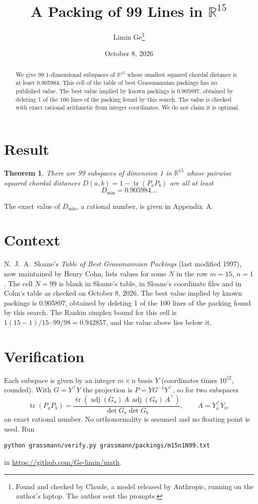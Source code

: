 \documentclass[11pt,a4paper]{article}
\title{A Packing of 99 Lines in $\mathbb{R}^{15}$}
\author{Limin Ge\thanks{Found and checked by Claude, a model released by Anthropic, running on the author's laptop. The author sent the prompts.}}
\date{October 8, 2026}
\newtheorem*{theorem}{Theorem}
\begin{document}
\maketitle
\begin{abstract}
We give 99 1-dimensional subspaces of $\mathbb{R}^{15}$ whose smallest squared chordal distance is at least 0.905984. This cell of the table of best Grassmannian packings has no published value. The best value implied by known packings is 0.905897, obtained by deleting 1 of the 100 lines of the packing found by this search. The value is checked with exact rational arithmetic from integer coordinates. We do not claim it is optimal.
\end{abstract}

\section{Result}
\begin{theorem}
There are 99 subspaces of dimension 1 in $\mathbb{R}^{15}$ whose pairwise squared chordal distances $D(a,b) = 1 - \operatorname{tr}(P_aP_b)$ are all at least
\[ D_{\min} = 0.905984\ldots \]
\end{theorem}
The exact value of $D_{\min}$, a rational number, is given in Appendix~A.


\section{Context}
N.~J.~A.~Sloane's \emph{Table of Best Grassmannian Packings} (last modified 1997), now maintained by Henry Cohn, lists values for some $N$ in the row $m=15$, $n=1$. The cell $N=99$ is blank in Sloane's table, in Sloane's coordinate files and in Cohn's table as checked on October 8, 2026. The best value implied by known packings is 0.905897, obtained by deleting 1 of the 100 lines of the packing found by this search. The Rankin simplex bound for this cell is $1(15-1)/15\cdot 99/98 = 0.942857$, and the value above lies below it.


\section{Verification}
Each subspace is given by an integer $m\times n$ basis $Y$ (coordinates times $10^{12}$, rounded). With $G=Y^\top Y$ the projection is $P=YG^{-1}Y^\top$, so for two subspaces
\[ \operatorname{tr}(P_aP_b)=\frac{\operatorname{tr}(\operatorname{adj}(G_a)\,A\,\operatorname{adj}(G_b)\,A^\top)}{\det G_a\det G_b},\qquad A=Y_a^\top Y_b, \]
an exact rational number. No orthonormality is assumed and no floating point is used. Run
\begin{verbatim}
python grassmann/verify.py grassmann/packings/m15n1N99.txt
\end{verbatim}
in \url{https://github.com/Ge-limin/math}.
\end{document}
